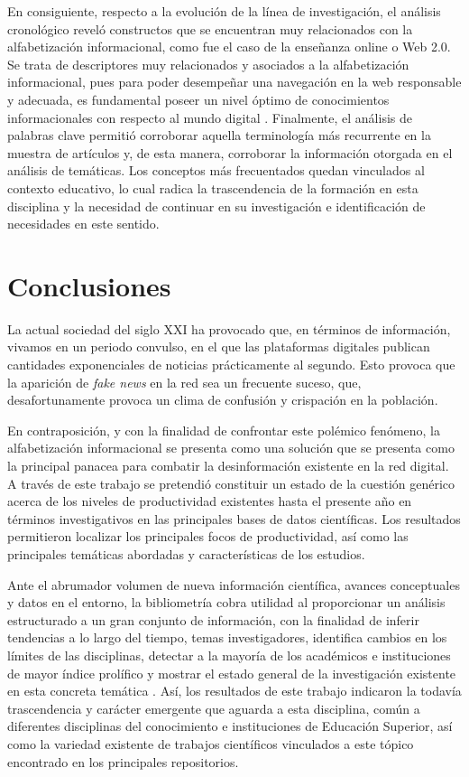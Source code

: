 \documentclass[spanish]{textolivre}
\begin{document}
En consiguiente, respecto a la evolución de la línea de investigación, el análisis cronológico reveló constructos que se encuentran muy relacionados con la alfabetización informacional, como fue el caso de la enseñanza online o Web 2.0. Se trata de descriptores muy relacionados y asociados a la alfabetización informacional, pues para poder desempeñar una navegación en la web responsable y adecuada, es fundamental poseer un nivel óptimo de conocimientos informacionales con respecto al mundo digital \cite{oecd2017}. %
Finalmente, el análisis de palabras clave permitió corroborar aquella terminología más recurrente en la muestra de artículos y, de esta manera, corroborar la información otorgada en el análisis de temáticas. Los conceptos más frecuentados quedan vinculados al contexto educativo, lo cual radica la trascendencia de la formación en esta disciplina y la necesidad de continuar en su investigación e identificación de necesidades en este sentido.

\section{Conclusiones}
La actual sociedad del siglo XXI ha provocado que, en términos de información, vivamos en un periodo convulso, en el que las plataformas digitales publican cantidades exponenciales de noticias prácticamente al segundo. Esto provoca que la aparición de \emph{fake news} en la red sea un frecuente suceso, que, desafortunamente provoca un clima de confusión y crispación en la población.

En contraposición, y con la finalidad de confrontar este polémico fenómeno, la alfabetización informacional se presenta como una solución que se presenta como la principal panacea para combatir la desinformación existente en la red digital. A través de este trabajo se pretendió constituir un estado de la cuestión genérico acerca de los niveles de productividad existentes hasta el presente año en términos investigativos en las principales bases de datos científicas. Los resultados permitieron localizar los principales focos de productividad, así como las principales temáticas abordadas y características de los estudios.

Ante el abrumador volumen de nueva información científica, avances conceptuales y datos en el entorno, la bibliometría cobra utilidad al proporcionar un análisis estructurado a un gran conjunto de información, con la finalidad de inferir tendencias a lo largo del tiempo, temas investigadores, identifica cambios en los límites de las disciplinas, detectar a la mayoría de los académicos e instituciones de mayor índice prolífico y mostrar el estado general de la investigación existente en esta concreta temática \cite{aria2017}. %
Así, los resultados de este trabajo indicaron la todavía trascendencia y carácter emergente que aguarda a esta disciplina, común a diferentes disciplinas del conocimiento e instituciones de Educación Superior, así como la variedad existente de trabajos científicos vinculados a este tópico encontrado en los principales repositorios.
\end{document}
